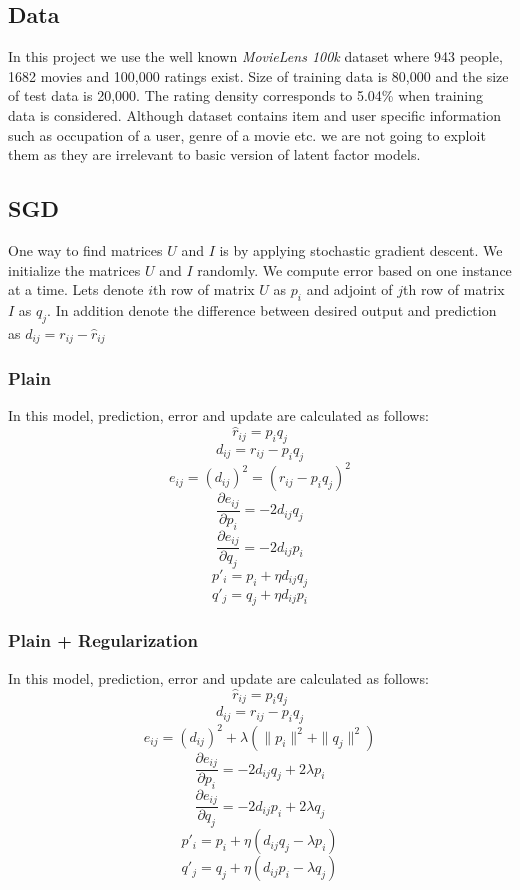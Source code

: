 \documentclass[11pt]{article}
\begin{document}
\begin{multicols}{2}
		\subsection{Data}
		In this project we use the well known \textit{MovieLens 100k} dataset where 943 people, 1682 movies and 100,000 ratings exist. Size of training data is 80,000 and the size of test data is 20,000. The rating density corresponds to 5.04\% when training data is considered. Although dataset contains item and user specific information such as occupation of a user, genre of a movie etc. we are not going to exploit them as they are irrelevant to basic version of latent factor models.
		
		\subsection{SGD}
		One way to find matrices $U$ and $I$ is by applying stochastic gradient descent. We initialize the matrices $U$ and $I$ randomly. We compute error based on one instance at a time. Lets denote $i$th row of matrix $U$ as $p_i$ and adjoint of $j$th row of matrix $I$ as $q_j$. In addition denote the difference between desired output and prediction as $d_{ij} = r_{ij} - \hat{r}_{ij}$
		\subsubsection{Plain}		
			In this model, prediction, error and update are calculated as follows:						
			$$\hat{r}_{ij} = p_i q_j$$ 
			$$d_{ij} = r_{ij} - p_i q_j$$
			$$e_{ij} = (d_{ij})^2 = (r_{ij} - p_i q_j)^2$$
			$$\frac{\partial e_{ij}}{\partial p_i} = -2 d_{ij} q_j$$
			$$\frac{\partial e_{ij}}{\partial q_j} = -2 d_{ij} p_i$$	
			$$p'_i = p_i + \eta d_{ij} q_j$$			
			$$q'_j = q_j + \eta d_{ij} p_i$$			
		\subsubsection{Plain + Regularization}		
			In this model, prediction, error and update are calculated as follows:						
			$$\hat{r}_{ij} = p_i q_j$$ 
			$$d_{ij} = r_{ij} - p_i q_j$$
			$$e_{ij} = (d_{ij})^2 + \lambda (\|p_i\|^2 + \|q_j\|^2)$$
			$$\frac{\partial e_{ij}}{\partial p_i} = -2 d_{ij} q_j + 2\lambda p_i$$
			$$\frac{\partial e_{ij}}{\partial q_j} = -2 d_{ij} p_i + 2\lambda q_j$$	
			$$p'_i = p_i + \eta (d_{ij} q_j - \lambda p_i)$$			
			$$q'_j = q_j + \eta (d_{ij} p_i - \lambda q_j)$$			

\end{multicols}
\end{document}
